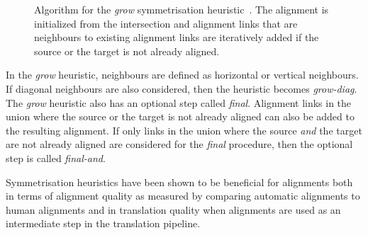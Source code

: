\begin{figure}
  \begin{algorithmic}[1]
       \hypertarget{alg:line:initGrow}{} \label{alg:line:initGrow}
             \hypertarget{alg:line:neighbours}{} \label{alg:line:neighbours}
               \hypertarget{alg:line:notAlreadyAligned}{} \label{alg:line:notAlreadyAligned}
                 \hypertarget{alg:line:addLink}{} \label{alg:line:addLink}
              \EndIf
            \EndFor
            \EndIf
          \EndFor
        \EndFor
        \EndIf
      \EndWhile
    \EndFunction
  \end{algorithmic}
  \caption{Algorithm for the \emph{grow} symmetrisation
    heuristic~\citep{koehn:2010:book}.
    The alignment is initialized from the intersection and alignment links
    that are neighbours to existing alignment links are iteratively added if the source
    or the target is not already aligned.}
  \label{alg:growHeuristic}
\end{figure}

In the \emph{grow} heuristic, neighbours are defined as horizontal or
vertical neighbours. If diagonal neighbours are also considered, then
the heuristic becomes \emph{grow-diag}. The \emph{grow} heuristic
also has an optional step called \emph{final}. Alignment
links in the union where the source or the target is not already
aligned can also be added to the resulting alignment. If only links
in the union where the source \emph{and} the target are not already
aligned are considered for the \emph{final} procedure, then
the optional step is called \emph{final-and}.

Symmetrisation heuristics have been shown to be beneficial for
alignments both in terms of alignment quality as measured
by comparing automatic alignments to human alignments and
in translation quality when alignments are used as an
intermediate step in the translation pipeline.

